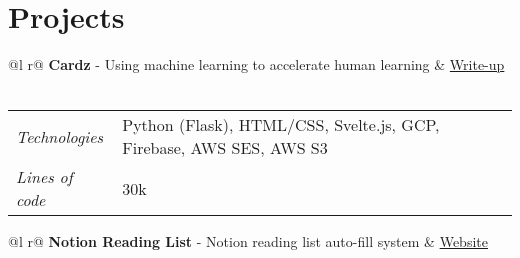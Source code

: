 \documentclass[a4paper,12pt]{article}
\begin{document}

\section{Projects}

\begin{tabularx}{\linewidth}{ @{}l r@{} }
\textbf{Cardz} - Using machine learning to accelerate human learning & \hfill \href{https://srg.id.au/posts/building-cardz}{Write-up} \\[3.75pt]
  \\

\end{tabularx}

\begin{tabularx}{\linewidth}{l X}
    \textit{Technologies} & \hfill Python (Flask), HTML/CSS, Svelte.js, GCP, Firebase, AWS SES, AWS S3 \\
    \textit{Lines of code} & \hfill 30k \\
\end{tabularx}

\begin{tabularx}{\linewidth}{ @{}l r@{} }
\textbf{Notion Reading List} - Notion reading list auto-fill system & \hfill \href{https://srg.id.au/notion-reading-list}{Website} \\[3.75pt]
  \\
\end{tabularx}
\end{document}
